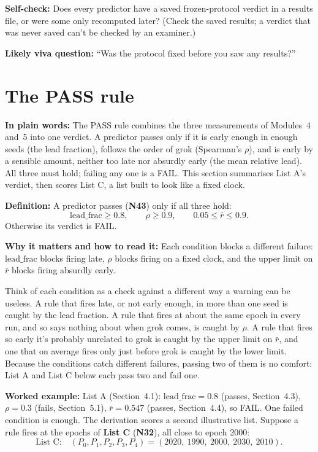 \documentclass[11pt,a4paper,oneside,openany]{report}
\newcommand{\leadfrac}{\mathrm{lead\_frac}}
\newcommand{\rbar}{\bar{r}}
\newcommand{\gl}[1]{\textbf{#1}}   %
\newcommand{\fplain}{\textbf{In plain words:} }
\newcommand{\fdef}{\textbf{Definition:} }
\newcommand{\fread}{\par\textbf{Why it matters and how to read it:} }
\newcommand{\fex}{\par\textbf{Worked example:} }
\newcommand{\fself}{\par\textbf{Self-check:} }
\newcommand{\fviva}{\par\textbf{Likely viva question:} }
\begin{document}
\fself Does every predictor have a saved frozen-protocol verdict in a results file, or were some only recomputed later? (Check the saved results; a verdict that was never saved can't be checked by an examiner.)
\fviva ``Was the protocol fixed before you saw any results?''

\section{The PASS rule}
\fplain The PASS rule combines the three measurements of Modules~4 and~5 into one verdict. A predictor passes only if it is early enough in enough seeds (the lead fraction), follows the order of grok (Spearman's $\rho$), and is early by a sensible amount, neither too late nor absurdly early (the mean relative lead). All three must hold; failing any one is a FAIL. This section summarises List A's verdict, then scores List C, a list built to look like a fixed clock.

\fdef A predictor passes (\gl{N43}) only if all three hold:
\[\leadfrac \ge 0.8, \qquad \rho \ge 0.9, \qquad 0.05 \le \rbar \le 0.9.\]
Otherwise its verdict is FAIL.
\fread Each condition blocks a different failure: $\leadfrac$ blocks firing late, $\rho$ blocks firing on a fixed clock, and the upper limit on $\rbar$ blocks firing absurdly early.

Think of each condition as a check against a different way a warning can be useless. A rule that fires late, or not early enough, in more than one seed is caught by the lead fraction. A rule that fires at about the same epoch in every run, and so says nothing about when grok comes, is caught by $\rho$. A rule that fires so early it's probably unrelated to grok is caught by the upper limit on $\rbar$, and one that on average fires only just before grok is caught by the lower limit. Because the conditions catch different failures, passing two of them is no comfort: List A and List C below each pass two and fail one.

\fex List A (Section~4.1): $\leadfrac = 0.8$ (passes, Section~4.3), $\rho = 0.3$ (fails, Section~5.1), $\rbar = 0.547$ (passes, Section~4.4), so FAIL. One failed condition is enough. The derivation scores a second illustrative list. Suppose a rule fires at the epochs of \textbf{List C} (\gl{N32}), all close to epoch 2000:
\[
\text{List C:}\quad (P_0, P_1, P_2, P_3, P_4) = (2020,\ 1990,\ 2000,\ 2030,\ 2010).
\]
\end{document}
